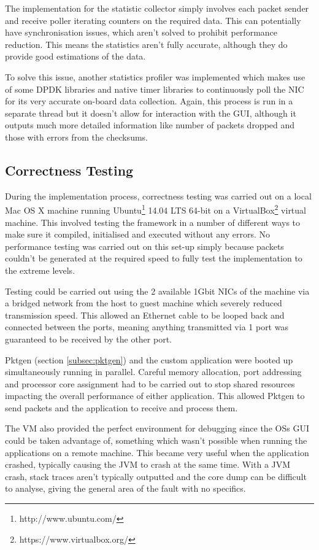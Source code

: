 \documentclass[final_report.tex]{subfiles}
\begin{document}
The implementation for the statistic collector simply involves each packet sender and receive poller iterating counters on the required data. This can potentially have synchronisation issues, which aren't solved to prohibit performance reduction. This means the statistics aren't fully accurate, although they do provide good estimations of the data.

To solve this issue, another statistics profiler was implemented which makes use of some DPDK libraries and native timer libraries to continuously poll the NIC for its very accurate on-board data collection. Again, this process is run in a separate thread but it doesn't allow for interaction with the GUI, although it outputs much more detailed information like number of packets dropped and those with errors from the checksums.

\subsection{Correctness Testing}
During the implementation process, correctness testing was carried out on a local Mac OS X machine running Ubuntu\footnote{http://www.ubuntu.com/} 14.04 LTS 64-bit on a VirtualBox\footnote{https://www.virtualbox.org/} virtual machine. This involved testing the framework in a number of different ways to make sure it compiled, initialised and executed without any errors. No performance testing was carried out on this set-up simply because packets couldn't be generated at the required speed to fully test the implementation to the extreme levels.

Testing could be carried out using the 2 available 1Gbit NICs of the machine via a bridged network from the host to guest machine which severely reduced transmission speed. This allowed an Ethernet cable to be looped back and connected between the ports, meaning anything transmitted via 1 port was guaranteed to be received by the other port.

Pktgen (section \ref{subsec:pktgen}) and the custom application were booted up simultaneously running in parallel. Careful memory allocation, port addressing and processor core assignment had to be carried out to stop shared resources impacting the overall performance of either application. This allowed Pktgen to send packets and the application to receive and process them.

The VM also provided the perfect environment for debugging since the OSs GUI could be taken advantage of, something which wasn't possible when running the applications on a remote machine.  This became very useful when the application crashed, typically causing the JVM to crash at the same time. With a JVM crash, stack traces aren't typically outputted and the core dump can be difficult to analyse, giving the general area of the fault with no specifics.
\end{document}
